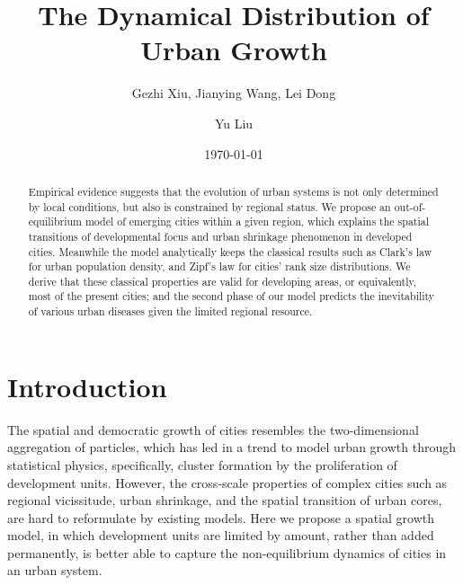 \documentclass[reprint,unsortedaddress,amsmath,amssymb,aps,prl,showkeys]{revtex4-2}
\begin{document}
\title{The Dynamical Distribution of Urban Growth}
\author{Gezhi Xiu, Jianying Wang, Lei Dong}
\author{Yu Liu}
\date{\today}

\begin{abstract}
    Empirical evidence suggests that the evolution of urban systems is not only determined by local conditions, but also is constrained by regional status. We propose an out-of-equilibrium model of emerging cities within a given region, which explains the spatial transitions of developmental focus and urban shrinkage phenomenon in developed cities. Meanwhile the model analytically keeps the classical results such as Clark's law for urban population density, and Zipf's law for cities' rank size distributions. We derive that these classical properties are valid for developing areas, or equivalently, most of the present cities; and the second phase of our model predicts the inevitability of various urban diseases given the limited regional resource. 
\end{abstract}

\maketitle

\section{Introduction}

The spatial and democratic growth of cities resembles the two-dimensional aggregation of particles, which has led in a trend to model urban growth through statistical physics, specifically, cluster formation by the proliferation of development units. However, the cross-scale properties of complex cities such as regional vicissitude, urban shrinkage, and the spatial transition of urban cores, are hard to reformulate by existing models. Here we propose a spatial growth model, in which development units are limited by amount, rather than added permanently, is better able to capture the non-equilibrium dynamics of cities in an urban system.
\end{document}
